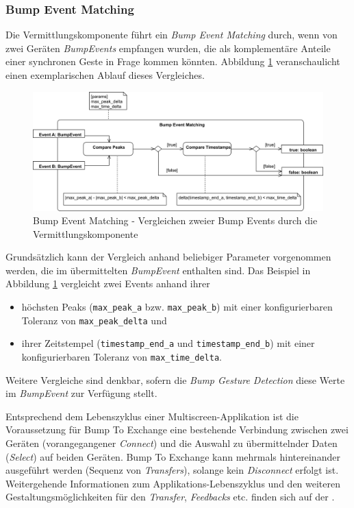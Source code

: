 {\subsubsection*{Bump Event Matching}
Die Vermittlungskomponente führt ein \textit{Bump Event Matching} durch, wenn von zwei Geräten \textit{BumpEvents} empfangen wurden, die als komplementäre Anteile einer synchronen Geste in Frage kommen könnten. Abbildung \ref{bump_event_matching} veranschaulicht einen exemplarischen Ablauf dieses Vergleiches.

\begin{figure}[H]
\includegraphics[width=\textwidth]{bump_event_matching.png}
\caption{Bump Event Matching - Vergleichen zweier Bump Events durch die Vermittlungskomponente}
\label{bump_event_matching}
\end{figure}

Grundsätzlich kann der Vergleich anhand beliebiger Parameter vorgenommen werden, die im übermittelten \textit{BumpEvent} enthalten sind. Das Beispiel in Abbildung \ref{bump_event_matching} vergleicht zwei Events anhand ihrer
\begin{itemize}
\item höchsten Peaks (\texttt{max\_peak\_a} bzw. \texttt{max\_peak\_b}) mit einer konfigurierbaren Toleranz von \texttt{max\_peak\_delta} und
\item ihrer Zeitstempel (\texttt{timestamp\_end\_a} und \texttt{timestamp\_end\_b}) mit einer  konfigurierbaren Toleranz von \texttt{max\_time\_delta}.
\end{itemize} 

Weitere Vergleiche sind denkbar, sofern die \textit{Bump Gesture Detection} diese Werte im \textit{BumpEvent} zur Verfügung stellt.

Entsprechend dem Lebenszyklus einer Multiscreen-Applikation ist die Voraussetzung für Bump To Exchange eine bestehende Verbindung zwischen zwei Geräten (vorangegangener \textit{Connect}) und die Auswahl zu übermittelnder Daten (\textit{Select}) auf beiden Geräten. Bump To Exchange kann mehrmals hintereinander ausgeführt werden (Sequenz von \textit{Transfers}), solange kein \textit{Disconnect} erfolgt ist. \\

Weitergehende Informationen zum Applikations-Lebenszyklus und den weiteren
Gestaltungsmöglichkeiten für den \textit{Transfer}, \textit{Feedbacks} etc. finden sich
auf der \developerpage.
}



